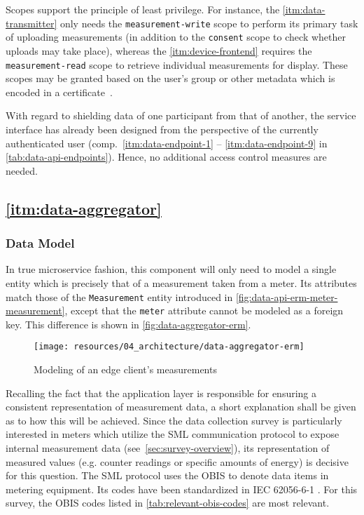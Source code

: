 \begin{description}
\FloatBarrier

	Scopes support the principle of least privilege. For instance, the \ref{itm:data-transmitter} only needs the \texttt{measurement-write} scope to perform its primary task of uploading measurements (in addition to the \texttt{consent} scope to check whether uploads may take place), whereas the \ref{itm:device-frontend} requires the \texttt{measurement-read} scope to retrieve individual measurements for display. These scopes may be granted based on the user's group or other metadata which is encoded in a certificate~\cite[p.~1]{butt2004certificate}.
\FloatBarrier

\end{description}

With regard to shielding data of one participant from that of another, the service interface has already been designed from the perspective of the currently authenticated user (comp.~\ref{itm:data-endpoint-1} -- \ref{itm:data-endpoint-9} in \autoref{tab:data-api-endpoints}). Hence, no additional access control measures are needed.


\subsection{\ref{itm:data-aggregator}}
\label{sec:component-specification-data-aggregator}

\subsubsection{Data Model}
\label{sec:data-aggregator-data-model}

In true microservice fashion, this component will only need to model a single entity which is precisely that of a measurement taken from a meter. Its attributes match those of the \texttt{Measurement} entity introduced in \autoref{fig:data-api-erm-meter-measurement}, except that the \texttt{meter} attribute cannot be modeled as a foreign key. This difference is shown in \autoref{fig:data-aggregator-erm}.

\begin{figure}[hbt]
  \centering
  \texttt{[image: resources/04\_architecture/data-aggregator-erm]}
  \caption{Modeling of an edge client's measurements}
  \label{fig:data-aggregator-erm}
\end{figure}

Recalling the fact that the application layer is responsible for ensuring a consistent representation of measurement data, a short explanation shall be given as to how this will be achieved. Since the data collection survey is particularly interested in meters which utilize the \acf{SML} communication protocol to expose internal measurement data (see~\autoref{sec:survey-overview}), its representation of measured values (e.g. counter readings or specific amounts of energy) is decisive for this question. The \ac{SML} protocol uses the \ac{OBIS} to denote data items in metering equipment. Its codes have been standardized in \acs{IEC} 62056-6-1 \cite{iec2017obis}. For this survey, the \ac{OBIS} codes listed in \autoref{tab:relevant-obis-codes} are most relevant.

